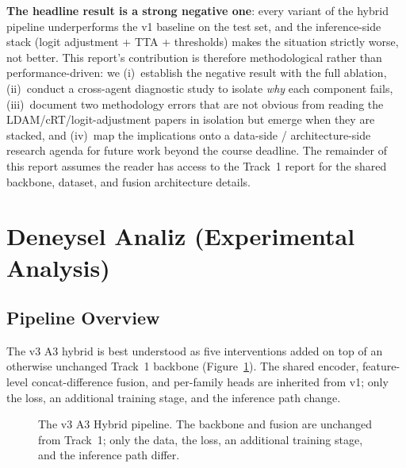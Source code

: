\documentclass[journal]{IEEEtran}
\begin{document}
\textbf{The headline result is a strong negative one}: every variant of the hybrid pipeline underperforms the v1 baseline on the test set, and the inference-side stack (logit adjustment + TTA + thresholds) makes the situation strictly worse, not better. This report's contribution is therefore methodological rather than performance-driven: we (i)~establish the negative result with the full ablation, (ii)~conduct a cross-agent diagnostic study to isolate \emph{why} each component fails, (iii)~document two methodology errors that are not obvious from reading the LDAM/cRT/logit-adjustment papers in isolation but emerge when they are stacked, and (iv)~map the implications onto a data-side / architecture-side research agenda for future work beyond the course deadline. The remainder of this report assumes the reader has access to the Track~1 report for the shared backbone, dataset, and fusion architecture details.

\section{Deneysel Analiz (Experimental Analysis)}\label{sec:deneyselanaliz}

\subsection{Pipeline Overview}\label{ssec:pipeline}

The v3 A3 hybrid is best understood as five interventions added on top of an otherwise unchanged Track~1 backbone (Figure~\ref{fig:pipeline}). The shared encoder, feature-level concat-difference fusion, and per-family heads are inherited from v1; only the loss, an additional training stage, and the inference path change.

\begin{figure}[!t]
  \centering
  \caption{The v3 A3 Hybrid pipeline. The backbone and fusion are unchanged from Track~1; only the data, the loss, an additional training stage, and the inference path differ.}
  \label{fig:pipeline}
\end{figure}
\end{document}
